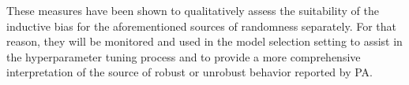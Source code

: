 These measures have been shown to qualitatively
assess the suitability of the inductive bias for the aforementioned sources of randomness separately.
For that reason, they will be monitored and used in the model selection setting to assist 
in the hyperparameter tuning process and to provide a more comprehensive interpretation
of the source of robust or unrobust behavior reported by PA. \\




